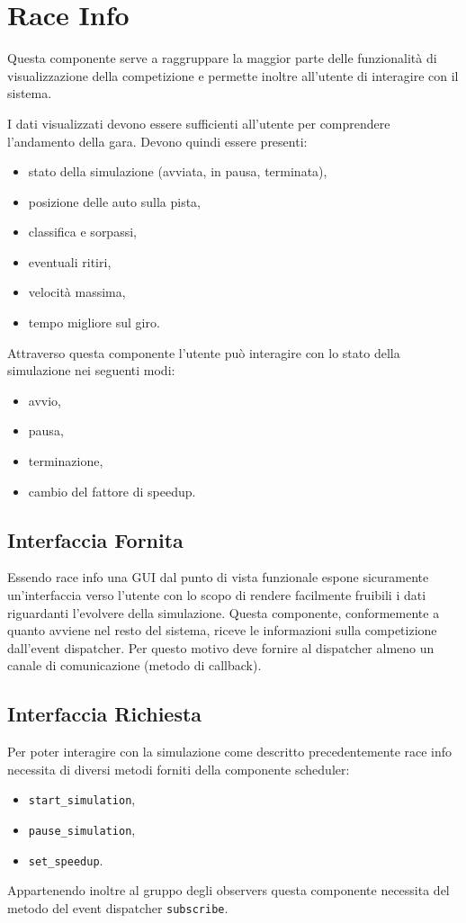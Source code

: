 \documentclass[11pt,a4paper]{report}
\newcommand{\fun}[1]{\texttt{#1}}
\begin{document}
\section{Race Info}
Questa componente serve a raggruppare la maggior parte delle funzionalità di visualizzazione della competizione e permette inoltre all'utente di interagire con il sistema.

I dati visualizzati devono essere sufficienti all'utente per comprendere l'andamento della gara. Devono quindi essere presenti:
\begin{itemize}
\item stato della simulazione (avviata, in pausa, terminata),
\item posizione delle auto sulla pista,
\item classifica e sorpassi,
\item eventuali ritiri,
\item velocità massima,
\item tempo migliore sul giro.
\end{itemize}
Attraverso questa componente l'utente può interagire con lo stato della simulazione nei seguenti modi:
\begin{itemize}
\item avvio,
\item pausa,
\item terminazione,
\item cambio del fattore di speedup.
\end{itemize}
\subsection*{Interfaccia Fornita}
Essendo race info una GUI dal punto di vista funzionale espone sicuramente un'interfaccia verso l'utente con lo scopo di rendere facilmente fruibili i dati riguardanti l'evolvere della simulazione.
Questa componente, conformemente a quanto avviene nel resto del sistema, riceve le informazioni sulla competizione dall'event dispatcher. Per questo motivo deve fornire al dispatcher almeno un canale di comunicazione (metodo di callback).
\subsection*{Interfaccia Richiesta}
Per poter interagire con la simulazione come descritto precedentemente race info necessita di diversi metodi forniti della componente scheduler:
\begin{itemize}
\item \fun{start\_simulation},
\item \fun{pause\_simulation},
\item \fun{set\_speedup}.
\end{itemize}
Appartenendo inoltre al gruppo degli observers questa componente necessita del metodo del event dispatcher \fun{subscribe}.
\end{document}

